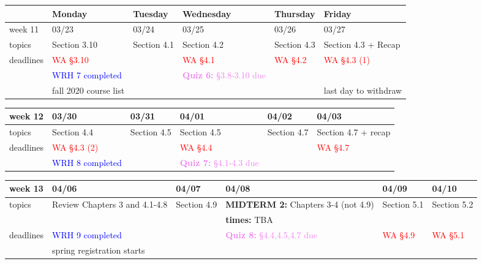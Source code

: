 \documentclass[11pt]{article}
\begin{document}
  
\begin{center}
\begin{tabularx}{\textwidth}{|p{1.5cm}|| L | L | L | L | L |}
\hline
&Monday & Tuesday & Wednesday & Thursday & Friday \\
\hline 
week 11&03/23&03/24&03/25&03/26&03/27\\ \hline
topics&Section 3.10&Section 4.1&Section 4.2&Section 4.3&Section 4.3 + Recap\\ 
\hline
deadlines&\textcolor{red}{WA \S 3.10}&&\textcolor{red}{WA \S 4.1}&\textcolor{red}{ WA \S 4.2}& \textcolor{red}{WA \S 4.3 (1)}\\
&\textcolor{blue}{WRH 7 completed}&&\textcolor{violet}{\textbf{Quiz 6:} \S3.8-3.10 due }&&\\
&\textcolor{ddgreen}{fall 2020 course list}&&&&\textcolor{ddgreen}{last day to withdraw} \\
\hline
\end{tabularx} \end{center}

\begin{center}
\begin{tabularx}{\textwidth}{|p{1.5cm}|| L | L | L | L | L |}
\hline
{}
week 12&03/30&03/31&04/01&04/02&04/03\\ \hline
topics&Section 4.4&Section 4.5&Section 4.5&Section 4.7&Section 4.7 + recap\\ 
\hline
deadlines& \textcolor{red}{WA \S 4.3 (2)}&&\textcolor{red}{WA \S 4.4}&&\textcolor{red}{WA \S 4.7}\\
&\textcolor{blue}{WRH 8 completed}& &\textcolor{violet}{\textbf{Quiz 7:} \S4.1-4.3 due }&&\\ \hline
\end{tabularx} \end{center}

\begin{center}
\begin{tabularx}{\textwidth}{|p{1.5cm}|| L | L | L | L | L |}
\hline
week 13&04/06&04/07&04/08&04/09&04/10\\ \hline
topics &Review Chapters 3 and 4.1-4.8&Section 4.9&\textcolor{dcyan}{\textbf{MIDTERM 2: }} Chapters 3-4 (not 4.9)&Section 5.1&Section 5.2\\ 
&&&\textcolor{dcyan}{\textbf{times:} TBA}&&\\ \hline

deadlines&\textcolor{blue}{WRH 9 completed} && \textcolor{violet}{\textbf{Quiz 8:} \S4.4,4.5,4.7 due }&\textcolor{red}{WA \S 4.9}&\textcolor{red}{WA \S 5.1}\\
&\textcolor{ddgreen}{spring registration starts} &&&& \\ \hline \end{tabularx} \end{center}
\end{document}
